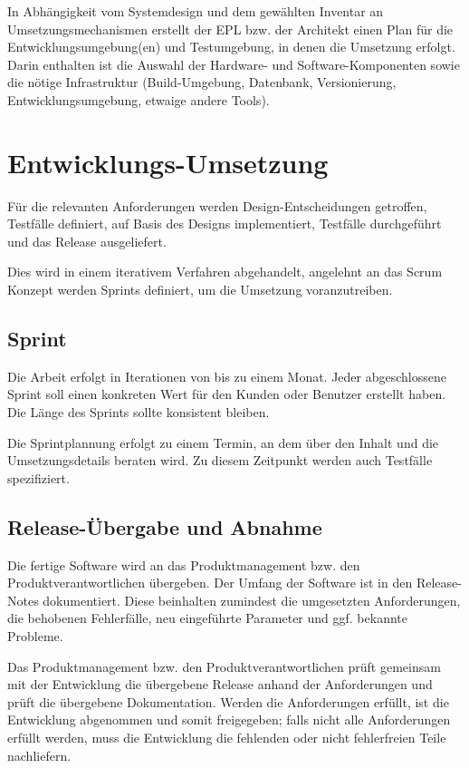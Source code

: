 In Abhängigkeit vom Systemdesign und dem gewählten Inventar an Umsetzungsmechanismen erstellt der \ac{EPL} bzw. der Architekt einen Plan für die Entwicklungsumgebung(en) und Testumgebung, in denen die Umsetzung erfolgt. Darin enthalten ist die Auswahl der Hardware- und Software-Komponenten sowie die nötige Infrastruktur (Build-Umgebung, Datenbank, Versionierung, Entwicklungsumgebung, etwaige andere Tools).

\section{Entwicklungs-Umsetzung}

Für die relevanten Anforderungen werden Design-Entscheidungen getroffen, Testfälle definiert, auf Basis des Designs implementiert, Testfälle durchgeführt und das Release ausgeliefert.

Dies wird in einem iterativem Verfahren abgehandelt, angelehnt an das Scrum Konzept werden Sprints definiert, um die Umsetzung voranzutreiben.

\subsection{Sprint}

Die Arbeit erfolgt in Iterationen von bis zu einem Monat. Jeder abgeschlossene Sprint soll einen konkreten Wert für den Kunden oder Benutzer erstellt haben. Die Länge des Sprints sollte konsistent bleiben. \parencite[vgl.][S. 62]{Rubin:2012}

Die Sprintplannung erfolgt zu einem Termin, an dem über den Inhalt und die Umsetzungsdetails beraten wird. \parencite[vgl.][S. 339]{Rubin:2012} Zu diesem Zeitpunkt werden auch Testfälle spezifiziert.

\subsection{Release-Übergabe und Abnahme}

Die fertige Software wird an das Produktmanagement bzw. den Produktverantwortlichen übergeben. Der Umfang der Software ist in den Release-Notes dokumentiert. Diese beinhalten zumindest die umgesetzten Anforderungen, die behobenen Fehlerfälle, neu eingeführte Parameter und ggf. bekannte Probleme. 

Das Produktmanagement bzw. den Produktverantwortlichen prüft gemeinsam mit der Entwicklung die übergebene Release anhand der Anforderungen und prüft die übergebene Dokumentation. Werden die Anforderungen erfüllt, ist die Entwicklung abgenommen und somit freigegeben; falls nicht alle Anforderungen erfüllt werden, muss die Entwicklung die fehlenden oder nicht fehlerfreien Teile nachliefern.

